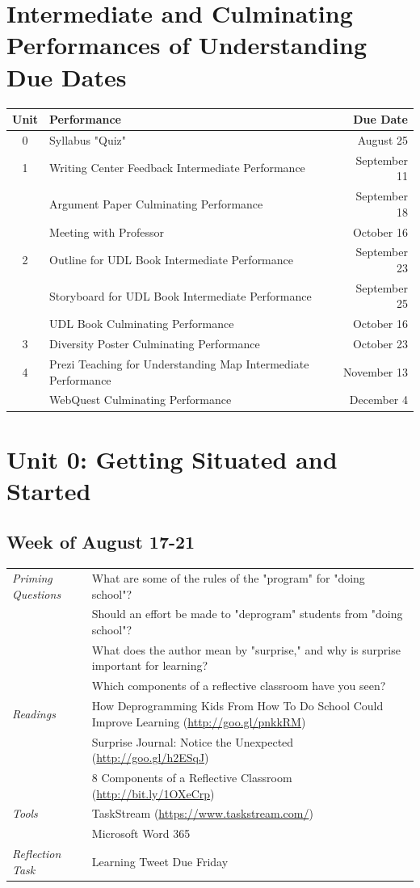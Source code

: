 \documentclass{tufte-handout}
\newcommand{\tabpq}{\faQuestionCircle\medspace\textit{Priming Questions}}
\newcommand{\tabread}{\faBook\medspace\textit{Readings}}
\newcommand{\tabtools}{\faWrench\medspace\textit{Tools}}
\newcommand{\tabtweet}{\faLightbulbO\medspace\textit{Reflection Task} & Learning Tweet Due Friday \\}
\newenvironment{tabsched}
	{\small
	\begin{tabular}{p{1.5in}p{4.5in}}
	\toprule}
	{\bottomrule
	\end{tabular}
	\normalsize}
\newcommand{\weekone}{August 17-21}
\begin{document}
\medskip

\section{Intermediate and Culminating Performances of Understanding Due Dates}
\begin{tabular}{clr}
	\toprule
	Unit & Performance & Due Date \\
	\midrule\midrule
	0 & Syllabus "Quiz" & August 25 \\
	\midrule
	1 & Writing Center Feedback Intermediate Performance & September 11 \\
	& Argument Paper Culminating Performance & September 18 \\
	& Meeting with Professor & October 16 \\
	\midrule
	2 & Outline for UDL Book Intermediate Performance & September 23 \\
	& Storyboard for UDL Book Intermediate Performance & September 25 \\
	& UDL Book Culminating Performance & October 16 \\
	\midrule
	3 & Diversity Poster Culminating Performance & October 23 \\
	\midrule
	4 & Prezi Teaching for Understanding Map Intermediate Performance  & November 13 \\
	& WebQuest Culminating Performance & December 4 \\
	\bottomrule
\end{tabular}

\section{Unit 0: Getting Situated and Started}

\subsection{Week of \weekone}

\begin{tabsched}
	\tabpq & What are some of the rules of the "program" for "doing school"? \\
	& Should an effort be made to "deprogram" students from "doing school"? \\
	& What does the author mean by "surprise," and why is surprise important for learning? \\
	& Which components of a reflective classroom have you seen? \\
	\midrule
	\tabread & How Deprogramming Kids From How To Do School Could Improve Learning (\url{http://goo.gl/pnkkRM}) \\
	& Surprise Journal: Notice the Unexpected (\url{http://goo.gl/h2ESqJ}) \\
	& 8 Components of a Reflective Classroom (\url{http://bit.ly/1OXeCrp}) \\
	\midrule
	\tabtools & TaskStream (\url{https://www.taskstream.com/}) \\
	& Microsoft Word 365 \\
	\midrule
	\tabtweet
\end{tabsched}
\end{document}
